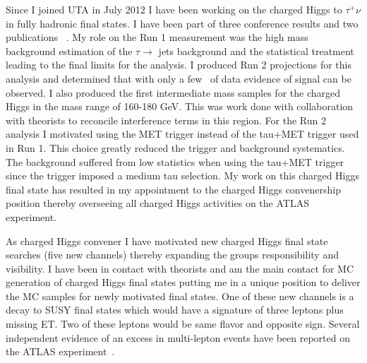 Since I joined UTA in July 2012 I have been working on the charged Higgs to $\tau^+\nu$ in fully hadronic final states.  I have been part of three conference results and two publications ~\cite{hptnu,atl2014,taunu,hptnu1}.
My role on the Run 1 measurement was the high mass background estimation of the $\tau \rightarrow$ jets background and the statistical treatment leading to the final 
limits for the analysis.  I produced Run 2 projections for this analysis and determined that with only a few \invfb\ of data evidence of signal can be observed.
I also produced the first intermediate mass samples for the charged Higgs in the mass range of 160-180 GeV.  This was work done with collaboration with theorists to reconcile interference terms in this region. 
For the Run 2 analysis I motivated using the MET trigger instead of the tau+MET trigger used in Run 1.  This choice greatly reduced the trigger and background systematics.  
The background suffered from low statistics when using the tau+MET trigger since the trigger imposed a medium tau selection.  
My work on this charged Higgs final state has resulted in my appointment to the charged Higgs convenership position thereby overseeing all charged Higgs activities on the ATLAS experiment.  

As charged Higgs convener I have motivated new charged Higgs final state searches (five new channels) thereby expanding the groups responsibility and visibility.  
I have been in contact with theorists and am the main contact for MC generation of charged Higgs final states putting me in a unique position to deliver the MC samples for newly motivated final states.  
One of these new channels is a decay to SUSY final states which would have a signature of three leptons plus missing ET.  Two
of these leptons would be same flavor and opposite sign.  Several independent evidence of an excess in multi-lepton events have been reported on the ATLAS experiment~\cite{3lep}.  


